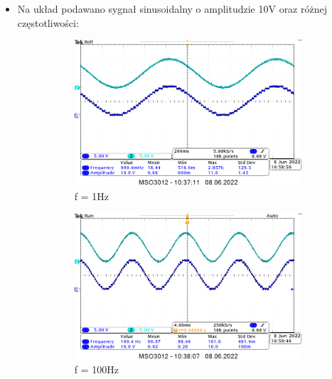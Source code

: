 \begin{itemize}
    \item Na układ podawano sygnał sinusoidalny o amplitudzie 10V oraz różnej częstotliwości:
        \begin{figure}[H]
            \centering
            \begin{subfigure}[H]{0.45\textwidth}
                \includegraphics[width=\textwidth]{img/3/3_sram_1hz_cropped.png}
                \caption*{f = 1Hz}
            \end{subfigure}
            \begin{subfigure}[H]{0.45\textwidth}
                \includegraphics[width=\textwidth]{img/3/3_sram_100hz_cropped.png}
                \caption*{f = 100Hz}
            \end{subfigure}
            \begin{subfigure}[H]{0.45\textwidth}

\end{subfigure}
\end{figure}
\end{itemize}
